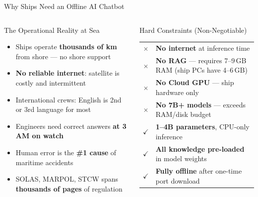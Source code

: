 \documentclass[aspectratio=169,11pt]{beamer}
\newcommand{\hl}[1]{{\color{navydeep}\bfseries #1}}
\begin{document}
\begin{frame}[shrink=10]{Why Ships Need an Offline AI Chatbot}
\begin{columns}[T]

\begin{block}{The Operational Reality at Sea}
  \scriptsize
  \begin{itemize}\setlength\itemsep{1pt}
    \item Ships operate \hl{thousands of km} from shore --- no shore support
    \item \hl{No reliable internet}: satellite is costly and intermittent
    \item International crews: English is 2nd or 3rd language for most
    \item Engineers need correct answers \hl{at 3\,AM on watch}
    \item Human error is the \hl{\#1 cause} of maritime accidents
    \item SOLAS, MARPOL, STCW spans \hl{thousands of pages} of regulation
  \end{itemize}
\end{block}

\vspace{3pt}
\begin{block}{Hard Constraints (Non-Negotiable)}
  \scriptsize
  \begin{tabular}{@{}cl@{}}
    $\times$ & \textbf{No internet} at inference time\\
    $\times$ & \textbf{No RAG} --- requires 7--9\,GB RAM (ship PCs have 4--6\,GB)\\
    $\times$ & \textbf{No Cloud GPU} --- ship hardware only\\
    $\times$ & \textbf{No 7B+ models} --- exceeds RAM/disk budget\\
    $\checkmark$ & \textbf{1--4B parameters}, CPU-only inference\\
    $\checkmark$ & \textbf{All knowledge pre-loaded} in model weights\\
    $\checkmark$ & \textbf{Fully offline} after one-time port download\\
  \end{tabular}
\end{block}



\end{columns}
\end{frame}
\end{document}
